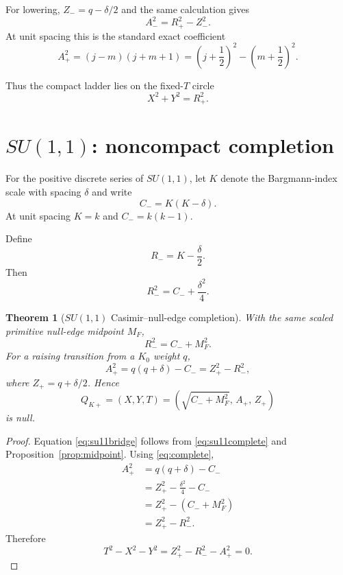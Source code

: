 \documentclass[11pt]{article}
\newtheorem{theorem}{Theorem}[section]
\theoremstyle{remark}
\begin{document}
For lowering, $Z_-=q-\delta/2$ and the same calculation gives
\[
A_-^2=R_+^2-Z_-^2.
\]
At unit spacing this is the standard exact coefficient
\[
A_+^2=(j-m)(j+m+1)
=
\left(j+\frac12\right)^2
-
\left(m+\frac12\right)^2.
\]

Thus the compact ladder lies on the fixed-$T$ circle
\[
X^2+Y^2=R_+^2.
\]

\section{$SU(1,1)$: noncompact completion}

For the positive discrete series of $SU(1,1)$, let $K$ denote the Bargmann-index scale with spacing $\delta$ and write
\begin{equation}
C_-=K(K-\delta).
\label{eq:su11cas}
\end{equation}
At unit spacing $K=k$ and $C_-=k(k-1)$.

Define
\begin{equation}
R_-=K-\frac{\delta}{2}.
\label{eq:Rminus}
\end{equation}
Then
\begin{equation}
R_-^2=C_-+\frac{\delta^2}{4}.
\label{eq:su11complete}
\end{equation}

\begin{theorem}[$SU(1,1)$ Casimir--null-edge completion]
\label{thm:su11}
With the same scaled primitive null-edge midpoint $M_F$,
\begin{equation}
\boxed{
R_-^2=C_-+M_F^2.
}
\label{eq:su11bridge}
\end{equation}
For a raising transition from a $K_0$ weight $q$,
\begin{equation}
A_+^2
=
q(q+\delta)-C_-
=
Z_+^2-R_-^2,
\label{eq:su11amp}
\end{equation}
where $Z_+=q+\delta/2$.  Hence
\begin{equation}
\boxed{
Q_{K+}
=
(X,Y,T)
=
\left(
\sqrt{C_-+M_F^2},\,
A_+,\,
Z_+
\right)
}
\label{eq:su11point}
\end{equation}
is null.
\end{theorem}

\begin{proof}
Equation \eqref{eq:su11bridge} follows from \eqref{eq:su11complete} and Proposition~\ref{prop:midpoint}.  Using \eqref{eq:complete},
\begin{align*}
A_+^2
&=
q(q+\delta)-C_-\\
&=
Z_+^2-\frac{\delta^2}{4}-C_-\\
&=
Z_+^2-(C_-+M_F^2)\\
&=
Z_+^2-R_-^2.
\end{align*}
Therefore
\[
T^2-X^2-Y^2
=
Z_+^2-R_-^2-A_+^2=0.
\]
\end{proof}
\end{document}
